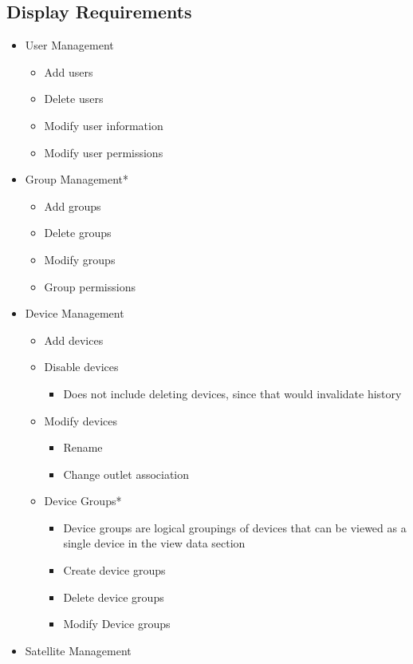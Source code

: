 \subsection{Display Requirements}
\begin{itemize}
 \item User Management
	\begin{itemize}
	 \item Add users
	 \item Delete users
	 \item Modify user information
	 \item Modify user permissions
	\end{itemize}
 \item Group Management*
	\begin{itemize}
	 \item Add groups
	 \item Delete groups
	 \item Modify groups
	 \item Group permissions
	\end{itemize}
 \item Device Management
	\begin{itemize}
	 \item Add devices
	 \item Disable devices
		\begin{itemize}
	 		\item Does not include deleting devices, since that would invalidate history
		\end{itemize}
	 \item Modify devices
		\begin{itemize}
	 		\item Rename
	 		\item Change outlet association
		\end{itemize}
	 \item Device Groups*
		\begin{itemize}
		 \item Device groups are logical groupings of devices that can be 
		 	viewed as a single device in the view data section
		 \item Create device groups
		 \item Delete device groups
		 \item Modify Device groups
		\end{itemize}
	\end{itemize}
 \item Satellite Management
	\begin{itemize}

\end{itemize}
\end{itemize}
